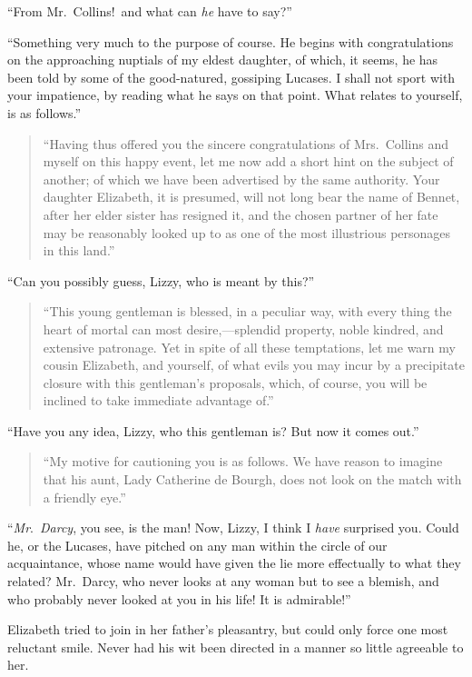 \documentclass[12pt,english,oneside]{book}
\begin{document}
{}``From Mr.\ Collins!\ and what can \textit{he} have to say?''

{}``Something very much to the purpose of course. He begins with
congratulations on the approaching nuptials of my eldest daughter,
of which, it seems, he has been told by some of the good-natured,
gossiping Lucases. I shall not sport with your impatience, by reading
what he says on that point. What relates to yourself, is as follows.''
\begin{quote}{}``Having thus offered you the sincere congratulations
of Mrs.\ Collins and myself on this happy event, let me now add a
short hint on the subject of another; of which we have been advertised
by the same authority. Your daughter Elizabeth, it is presumed, will
not long bear the name of Bennet, after her elder sister has resigned
it, and the chosen partner of her fate may be reasonably looked up
to as one of the most illustrious personages in this land.''\end{quote}

{}``Can you possibly guess, Lizzy, who is meant by this?''\begin{quote}{}``This
young gentleman is blessed, in a peculiar way, with every thing the
heart of mortal can most desire,\mbox{---}splendid property, noble
kindred, and extensive patronage. Yet in spite of all these temptations,
let me warn my cousin Elizabeth, and yourself, of what evils you may
incur by a precipitate closure with this gentleman's proposals, which,
of course, you will be inclined to take immediate advantage of.''\end{quote}

{}``Have you any idea, Lizzy, who this gentleman is? But now it comes
out.''

\begin{quote}{}``My motive for cautioning you is as follows. We
have reason to imagine that his aunt, Lady Catherine de Bourgh, does
not look on the match with a friendly eye.''\end{quote}

{}``\textit{Mr}.\ \textit{Darcy}, you see, is the man! Now, Lizzy,
I think I \textit{have} surprised you. Could he, or the Lucases, have
pitched on any man within the circle of our acquaintance, whose name
would have given the lie more effectually to what they related? Mr.\ Darcy,
who never looks at any woman but to see a blemish, and who probably
never looked at you in his life! It is admirable!''

Elizabeth tried to join in her father's pleasantry, but could only
force one most reluctant smile. Never had his wit been directed in
a manner so little agreeable to her.
\end{document}

